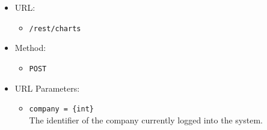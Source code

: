 \begin{itemize}
    
    \item URL: 
    \begin{itemize}
        \item \texttt{/rest/charts}
    \end{itemize}
    
    \item Method: 
    \begin{itemize}
        \item \texttt{POST}
    \end{itemize}
    
    \item URL Parameters: 
    \begin{itemize}
        \item \texttt{company = \{int\}} \\
        The identifier of the company currently logged into the system.
    \end{itemize}


\end{itemize}
